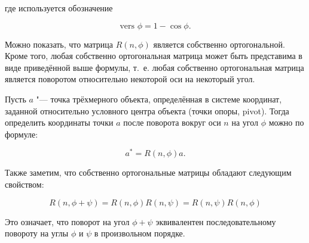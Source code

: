 \noindent где используется обозначение

$$\textrm{vers }\phi=1-\cos \phi.$$

Можно показать, что матрица $R(n,\phi)$ является собственно ортогональной. Кроме того, любая собственно ортогональная
матрица может быть представима в виде приведённой выше формулы, т.~е. любая собственно ортогональная матрица является
поворотом относительно некоторой оси на некоторый угол.

Пусть $a$ "--- точка трёхмерного объекта, определённая в системе координат, заданной относительно условного центра
объекта (точки опоры, pivot). Тогда определить координаты точки $a$ после поворота вокруг оси $n$ на угол $\phi$
можно по формуле:

$$
a^*=R(n,\phi)a.
$$

Также заметим, что собственно ортогональные матрицы обладают следующим свойством:

$$
R(n,\phi+\psi)=R(n,\phi)R(n,\psi)=R(n,\psi)R(n,\phi)
$$

Это означает, что поворот на угол $\phi+\psi$ эквивалентен последовательному повороту на углы $\phi$ и $\psi$ в
произвольном порядке.
